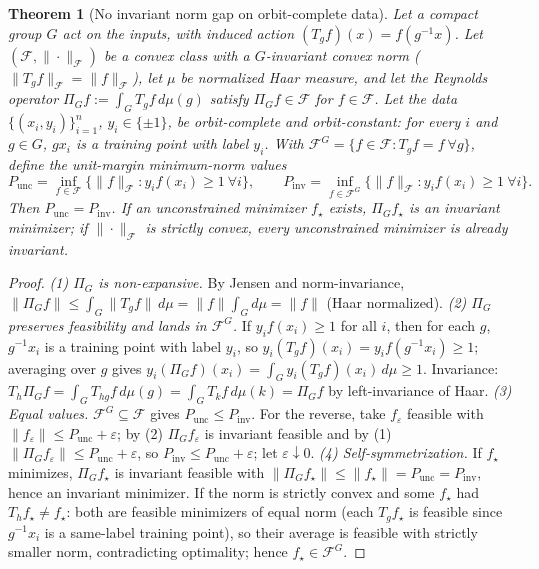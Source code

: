 \documentclass[11pt]{article}
\newtheorem{theorem}{Theorem}
\theoremstyle{definition}
\begin{document}
\begin{theorem}[No invariant norm gap on orbit-complete data]\label{thm:no-gap}
Let a compact group $G$ act on the inputs, with induced action $(T_gf)(x)=f(g^{-1}x)$. Let
$(\mathcal F,\|\cdot\|_{\mathcal F})$ be a convex class with a $G$-invariant convex norm
($\|T_gf\|_{\mathcal F}=\|f\|_{\mathcal F}$), let $\mu$ be normalized Haar measure, and let the
Reynolds operator $\Pi_Gf:=\int_G T_gf\,d\mu(g)$ satisfy $\Pi_Gf\in\mathcal F$ for $f\in\mathcal F$.
Let the data $\{(x_i,y_i)\}_{i=1}^n$, $y_i\in\{\pm1\}$, be \emph{orbit-complete and orbit-constant}:
for every $i$ and $g\in G$, $gx_i$ is a training point with label $y_i$. With
$\mathcal F^G=\{f\in\mathcal F:T_gf=f\ \forall g\}$, define the unit-margin minimum-norm values
\[
P_{\mathrm{unc}}=\inf_{f\in\mathcal F}\{\|f\|_{\mathcal F}: y_if(x_i)\ge1\ \forall i\},\qquad
P_{\mathrm{inv}}=\inf_{f\in\mathcal F^G}\{\|f\|_{\mathcal F}: y_if(x_i)\ge1\ \forall i\}.
\]
Then $P_{\mathrm{unc}}=P_{\mathrm{inv}}$. If an unconstrained minimizer $f_\star$ exists, $\Pi_Gf_\star$
is an invariant minimizer; if $\|\cdot\|_{\mathcal F}$ is strictly convex, every unconstrained
minimizer is already invariant.
\end{theorem}
\begin{proof}
\emph{(1) $\Pi_G$ is non-expansive.} By Jensen and norm-invariance,
$\|\Pi_Gf\|\le\int_G\|T_gf\|\,d\mu=\|f\|\int_G d\mu=\|f\|$ (Haar normalized).
\emph{(2) $\Pi_G$ preserves feasibility and lands in $\mathcal F^G$.} If $y_if(x_i)\ge1$ for all $i$,
then for each $g$, $g^{-1}x_i$ is a training point with label $y_i$, so $y_i(T_gf)(x_i)=y_if(g^{-1}x_i)\ge1$;
averaging over $g$ gives $y_i(\Pi_Gf)(x_i)=\int_G y_i(T_gf)(x_i)\,d\mu\ge1$. Invariance:
$T_h\Pi_Gf=\int_G T_{hg}f\,d\mu(g)=\int_G T_kf\,d\mu(k)=\Pi_Gf$ by left-invariance of Haar.
\emph{(3) Equal values.} $\mathcal F^G\subseteq\mathcal F$ gives $P_{\mathrm{unc}}\le P_{\mathrm{inv}}$.
For the reverse, take $f_\varepsilon$ feasible with $\|f_\varepsilon\|\le P_{\mathrm{unc}}+\varepsilon$;
by (2) $\Pi_Gf_\varepsilon$ is invariant feasible and by (1) $\|\Pi_Gf_\varepsilon\|\le P_{\mathrm{unc}}+\varepsilon$,
so $P_{\mathrm{inv}}\le P_{\mathrm{unc}}+\varepsilon$; let $\varepsilon\downarrow0$.
\emph{(4) Self-symmetrization.} If $f_\star$ minimizes, $\Pi_Gf_\star$ is invariant feasible with
$\|\Pi_Gf_\star\|\le\|f_\star\|=P_{\mathrm{unc}}=P_{\mathrm{inv}}$, hence an invariant minimizer. If the
norm is strictly convex and some $f_\star$ had $T_hf_\star\ne f_\star$: both are feasible minimizers of
equal norm (each $T_gf_\star$ is feasible since $g^{-1}x_i$ is a same-label training point), so their
average is feasible with strictly smaller norm, contradicting optimality; hence $f_\star\in\mathcal F^G$.
\end{proof}
\end{document}
